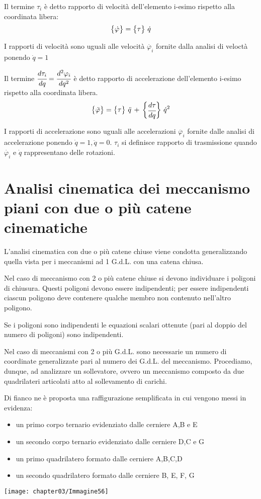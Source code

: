 		Il termine $\tau_i$ è detto rapporto di velocità dell'elemento i-esimo rispetto alla coordinata libera:
		\[
		\begin{Bmatrix}\dot{\varphi}\end{Bmatrix} = \begin{Bmatrix}\tau\end{Bmatrix}\,\dot{q}
		\]
		
		I rapporti di velocità sono uguali alle velocità $\dot{\varphi_i}$ fornite dalla analisi di veloctà ponendo $\dot{q} = 1$
		
		Il termine $\cfrac{d\tau_i}{dq} = \cfrac{d^2\varphi_i}{dq^2}$ è detto rapporto di accelerazione dell'elemento i-esimo rispetto alla coordinata libera.
		\[
		\begin{Bmatrix}\ddot{\varphi}\end{Bmatrix} = \begin{Bmatrix}\tau\end{Bmatrix}\,\ddot{q}\,+\,\begin{Bmatrix}\cfrac{d\tau}{dq}\end{Bmatrix}\,\dot{q}^2
		\]
		
		I rapporti di accelerazione sono uguali alle accelerazioni $\ddot{\varphi_i}$ fornite dalle analisi di accelerazione ponendo $\dot{q}=1, \ddot{q}=0$. $\tau_i$ si definisce rapporto di trasmissione quando $\dot{\varphi_i}$ e $\dot{q}$ rappresentano delle rotazioni.
		
			
	\section{Analisi cinematica dei meccanismo piani con due o più catene cinematiche}
	
	L'analisi cinematica con due o più catene chiuse viene condotta generalizzando quella vista per i meccanismi ad 1 G.d.L. con una catena chiusa.
	
	Nel caso di meccanismo con 2 o più catene chiuse si devono individuare i poligoni di chiusura. Questi poligoni devono essere indipendenti; per essere indipendenti ciascun poligono deve contenere qualche membro non contenuto nell'altro poligono. 
	
	Se i poligoni sono indipendenti le equazioni scalari ottenute (pari al doppio del numero di poligoni) sono indipendenti.
	
Nel caso di meccanismi con 2 o più G.d.L. sono necessarie un numero di coordinate generalizzate pari al numero dei G.d.L. del meccanismo.
Procediamo, dunque, ad analizzare un sollevatore, ovvero un meccanismo composto da due quadrilateri articolati atto al sollevamento di carichi.
\vspace{1mm}

\begin{minipage}{.55\textwidth}
Di fianco ne è proposta una raffigurazione semplificata in cui vengono messi in evidenza:

\begin{itemize}
\item un primo corpo ternario evidenziato dalle cerniere A,B e E
\item un secondo corpo ternario evidenziato dalle cerniere D,C e G
\item un primo quadrilatero formato dalle cerniere A,B,C,D
\item un secondo quadrilatero formato dalle cerniere B, E, F, G
\end{itemize}
\end{minipage}
\hfill
\begin{minipage}{.4\textwidth}
\centering
\texttt{[image: chapter03/Immagine56]}
\end{minipage}

